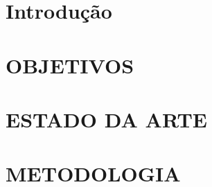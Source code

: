 \documentclass[
  a4paper,%
  12pt,%
  english,%
  brazilian,%
]{article}
\begin{document}






\section*{Introdução}%
\label{sect:intro}


\section*{OBJETIVOS} \label{sect:obj}



\section*{ESTADO DA ARTE} \label{sect:estadoarte}



\section*{METODOLOGIA} \label{sect:metodologia}




\printbibliography


%

\end{document}
